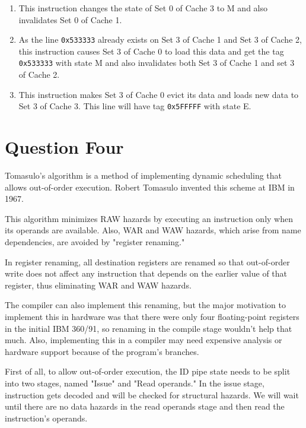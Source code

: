 \documentclass[12pt]{article}
\begin{document}
\begin{enumerate}[label=\alph*.]
\begin{enumerate}[label=\arabic*.]
	\item This instruction changes the state of Set 0 of Cache 3 to M and also invalidates Set 0 of Cache 1.
	
	\item
	As the line \Verb+0x533333+ already exists on Set 3 of Cache 1 and Set 3 of Cache 2, this instruction causes Set 3 of Cache 0 to load this data and get the tag \Verb+0x533333+ with state M and also invalidates both Set 3 of Cache 1 and set 3 of Cache 2.
	
	\item
	This instruction makes Set 3 of Cache 0 evict its data and loads new data to Set 3 of Cache 3. This line will have tag \Verb+0x5FFFFF+ with state E.
\end{enumerate}

\end{enumerate}
	
	
	
\newpage

\section{Question Four}
Tomasulo's algorithm is a method of implementing dynamic scheduling that allows out-of-order execution. Robert Tomasulo invented this scheme at IBM in 1967.

This algorithm minimizes RAW hazards by executing an instruction only when its operands are available. Also, WAR and WAW hazards, which arise from name dependencies, are avoided by "register renaming."

In register renaming, all destination registers are renamed so that out-of-order write does not affect any instruction that depends on the earlier value of that register, thus eliminating WAR and WAW hazards.

The compiler can also implement this renaming, but the major motivation to implement this in hardware was that there were only four floating-point registers in the initial IBM 360/91, so renaming in the compile stage wouldn't help that much. Also, implementing this in a compiler may need expensive analysis or hardware support because of the program's branches.

First of all, to allow out-of-order execution, the ID pipe state needs to be split into two stages, named "Issue" and "Read operands." In the issue stage, instruction gets decoded and will be checked for structural hazards. We will wait until there are no data hazards in the read operands stage and then read the instruction's operands.
\end{document}
